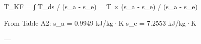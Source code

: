 T_KF = ∫ T_ds / (s_a - s_e) = T × (s_a - s_e) / (s_a - s_e)  

From Table A2:  
s_a = 0.9949 kJ/kg·K  
s_e = 7.2553 kJ/kg·K  

---